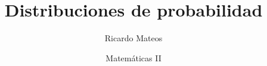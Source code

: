 \documentclass[8pt]{beamer}
\title{Distribuciones de probabilidad}
\author{Ricardo Mateos}
\institute[UHEI-IVED]{Departamento de Matemáticas \\ UHEI - IVED}
\date{Matemáticas II}
\begin{document}
\begin{frame}
\maketitle
\end{frame}

\begin{frame}
\tableofcontents
\end{frame}
\end{document}
